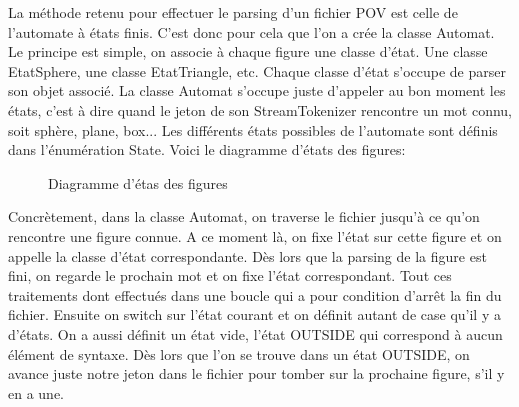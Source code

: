 \documentclass[../../Rapport RayTracer]{subfiles}
\begin{document}
La méthode retenu pour effectuer le parsing d'un fichier POV est celle de l'automate à états finis. C'est donc pour cela que l'on a crée la classe Automat. Le principe est simple, on associe à chaque figure une classe d'état. Une classe EtatSphere, une classe EtatTriangle, etc. Chaque classe d'état s'occupe de parser son objet associé. La classe Automat s'occupe juste d'appeler au bon moment les états, c'est à dire quand le jeton de son StreamTokenizer rencontre un mot connu, soit sphère, plane, box... Les différents états possibles de l'automate sont définis dans l'énumération State. 
Voici le diagramme d'états des figures:

\begin{figure}[h!]
	
	\caption{Diagramme d'étas des figures}
	\label{diagrammeEtatFigure}
\end{figure}
\FloatBarrier


Concrètement, dans la classe Automat, on traverse le fichier jusqu'à ce qu'on rencontre une figure connue. A ce moment là, on fixe l'état sur cette figure et on appelle la classe d'état correspondante. Dès lors que la parsing de la figure est fini, on regarde le prochain mot et on fixe l'état correspondant. Tout ces traitements dont effectués dans une boucle qui a pour condition d'arrêt la fin du fichier. Ensuite on switch sur l'état courant et on définit autant de case qu'il y a d'états. On a aussi définit un état vide, l'état OUTSIDE qui correspond à aucun élément de syntaxe. Dès lors que l'on se trouve dans un état OUTSIDE, on avance juste notre jeton dans le fichier pour tomber sur la prochaine figure, s'il y en a une.
\end{document}
